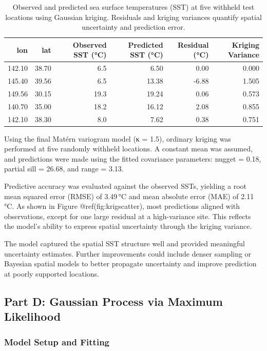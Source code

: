 \documentclass[
  11pt,
]{article}
\begin{document}
\begin{table}

\caption{Observed and predicted sea surface temperatures (SST) at five withheld
test locations using Gaussian kriging. Residuals and kriging variances
quantify spatial uncertainty and prediction error.}
\centering
\begin{tabular}[t]{rrrrrr}
\toprule
lon & lat & Observed SST (°C) & Predicted SST (°C) & Residual (°C) & Kriging Variance\\
\midrule
142.10 & 38.70 & 6.5 & 6.50 & 0.00 & 0.000\\
145.40 & 39.56 & 6.5 & 13.38 & -6.88 & 1.505\\
149.56 & 30.15 & 19.3 & 19.24 & 0.06 & 0.573\\
140.70 & 35.00 & 18.2 & 16.12 & 2.08 & 0.855\\
142.10 & 38.30 & 8.0 & 7.62 & 0.38 & 0.751\\
\bottomrule
\end{tabular}
\end{table}

Using the final Matérn variogram model (κ = 1.5), ordinary kriging was
performed at five randomly withheld locations. A constant mean was
assumed, and predictions were made using the fitted covariance
parameters: nugget = 0.18, partial sill = 26.68, and range = 3.13.

Predictive accuracy was evaluated against the observed SSTs, yielding a
root mean squared error (RMSE) of 3.49\,°C and mean absolute error (MAE)
of 2.11\,°C. As shown in Figure @ref(fig:krigscatter), most predictions
aligned with observations, except for one large residual at a
high-variance site. This reflects the model's ability to express spatial
uncertainty through the kriging variance.

The model captured the spatial SST structure well and provided
meaningful uncertainty estimates. Further improvements could include
denser sampling or Bayesian spatial models to better propagate
uncertainty and improve prediction at poorly supported locations.

\subsection{Part D: Gaussian Process via Maximum
Likelihood}\label{part-d-gaussian-process-via-maximum-likelihood}

\subsubsection{Model Setup and Fitting}\label{model-setup-and-fitting}
\end{document}
